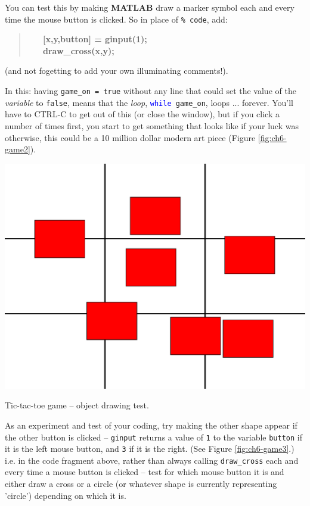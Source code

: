 \documentclass{tufte-book} %
\newenvironment{docspecbold}{\begin{quotation}\ttfamily\bfseries\parskip0pt\parindent0pt\ignorespaces}{\end{quotation}}
\begin{document}
You can test this by making \textbf{MATLAB} draw a marker symbol each and every time the mouse button is clicked. So in place of \texttt{\textcolor[rgb]{0,0.501961,0}{\% code}}, add:
\vspace{-1mm}
\begin{docspecbold}
\ \ \    [x,y,button] = ginput(1);\\
\ \ \    draw\_cross(x,y);
\end{docspecbold}
\vspace{-1mm}
(and not fogetting to add your own illuminating  comments!).

In this: having \texttt{game\_on = true} without any line that could set the value of the \textit{variable} to \texttt{false}, means that the  \textit{loop}, \texttt{\textcolor{blue}{while} game\_on}, loops ... forever. You'll have to \textsf{CTRL-C} to get out of this (or close the window), but if you click a number of times first, you start to get something that looks like if your luck was otherwise, this could be a 10 million dollar modern art piece (Figure \ref{fig:ch6-game2}).

\begin{marginfigure}[-0.0in]
\includegraphics[width=\linewidth]{ch6-game2.eps}
\caption{Tic-tac-toe game -- object drawing test.}
\label{fig:ch6-game2}
\end{marginfigure}

\newthought{[\textbf{\textcolor{red}{OPTIONAL}}]} As an experiment and test of your coding, try making the other shape appear if the other button is clicked -- \texttt{ginput} returns a value of \texttt{1} to the variable \texttt{button} if it is the left mouse button, and \texttt{3} if it is the right. (See Figure \ref{fig:ch6-game3}.)
i.e. in the code fragment above, rather than always calling \texttt{draw\_cross} each and every time a mouse button is clicked -- test for which mouse button it is and either draw a cross or a circle (or whatever shape is currently representing 'circle') depending on which it is.
\end{document}
